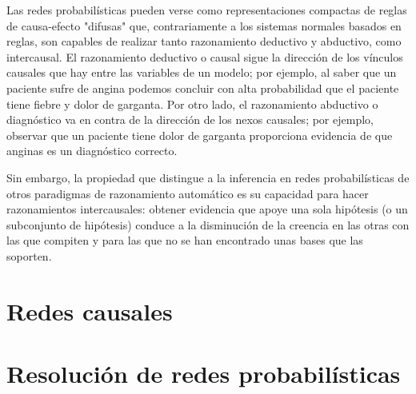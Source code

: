Las redes probabilísticas pueden verse como representaciones compactas de reglas de causa-efecto "difusas" 
que, contrariamente a los sistemas normales basados en reglas, son capables de realizar tanto razonamiento 
deductivo y abductivo, como intercausal. El razonamiento deductivo o causal
sigue la dirección de los vínculos causales que hay entre las variables de un modelo; por ejemplo, al saber
que un paciente sufre de angina podemos concluir con alta probabilidad que
el paciente tiene fiebre y dolor de garganta. Por otro lado, el razonamiento abductivo o diagnóstico 
va en contra de la dirección de los nexos causales; por ejemplo, observar
que un paciente tiene dolor de garganta proporciona evidencia de que anginas es un diagnóstico correcto.

Sin embargo, la propiedad que distingue a la inferencia en redes probabilísticas
de otros paradigmas de razonamiento automático es su capacidad para hacer razonamientos intercausales: 
obtener evidencia que apoye una sola hipótesis (o un subconjunto de
hipótesis) conduce a la disminución de la creencia en las otras con las que compiten y para las que no se 
han encontrado unas bases que las soporten. 

\section{Redes causales}

\section{Resolución de redes probabilísticas}


